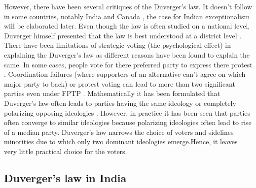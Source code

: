 \begin{sloppypar}
\vspace{0.3cm}

However, there have been several critiques of the Duverger's law. It doesn't follow in some countries, notably India and Canada \citep{gaines1999duverger}, the case for Indian exceptionalism will be elaborated later. Even though the law is often studied on a national level, Duverger himself presented that the law is best understood at a district level \citep{diwakar2007duverger}. There have been limitations of strategic voting (the psychological effect) in explaining the Duverger's law as different reasons have been found to explain the same. In some cases, people vote for there preferred party to express there protest \citep{ziegfeld2021accounts}. Coordination failures (where supporters of an alternative can’t agree on which major party to back) or protest voting can lead to more than two significant parties even under FPTP \citep{singer2013duverger}. Mathematically it has been formulated that Duverger's law often leads to parties having the same ideology or completely polarizing opposing ideologies \citep{fey2007duverger}. However, in practice it has been seen that parties often converge to similar ideologies because polarizing ideologies often lead to rise of a median party.  Duverger's law narrows the choice of voters and sidelines minorities due to which only two dominant ideologies emerge.Hence, it leaves very little practical choice for the voters.

\subsection{Duverger's law in India}


\end{sloppypar}

